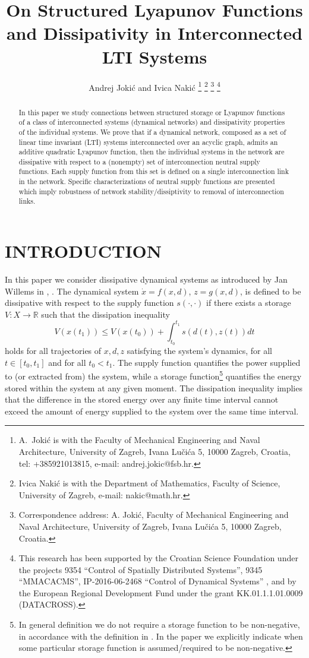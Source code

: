 \documentclass[11pt,a4paper,oneside,DIV=12,headings=small]{scrartcl}
\title{
On Structured Lyapunov Functions and Dissipativity in Interconnected LTI Systems
}
\author{Andrej Joki\'{c} and Ivica Naki\'{c}%
\thanks{A.\ Joki\'{c} is with the Faculty of Mechanical Engineering and Naval Architecture, University of Zagreb, Ivana Lu\v{c}i{\'c}a 5, 10000 Zagreb, Croatia, tel: +385921013815, e-mail: andrej.jokic@fsb.hr.}
\thanks{Ivica Naki\'{c} is with the Department of Mathematics,
        Faculty of Science, University of Zagreb,
        e-mail: nakic@math.hr.}%
\thanks{Correspondence address: A. Joki\'{c}, Faculty of Mechanical Engineering and Naval Architecture, University of Zagreb, Ivana Lu\v{c}i{\'c}a 5, 10000 Zagreb, Croatia.}
\thanks{This research has been supported by the Croatian Science Foundation under the projects 9354 ``Control of Spatially Distributed Systems'', 9345 ``MMACACMS'', IP-2016-06-2468 ``Control of Dynamical Systems''
, and by the European Regional Development Fund under the grant KK.01.1.1.01.0009 (DATACROSS).}
}
\newcommand{\Rset}{\mathbb{R}}
\theoremstyle{plain}
\begin{document}
\maketitle



\begin{abstract}
In this paper we study connections between structured storage or Lyapunov functions of a class of interconnected systems (dynamical networks) and dissipativity properties of the individual systems. We prove that if a dynamical network, composed as a set of linear time invariant (LTI) systems interconnected over an acyclic graph, admits an additive quadratic Lyapunov function, then the individual systems in the network are dissipative with respect to a (nonempty) set of interconnection neutral supply functions. Each supply function from this set is defined on a single interconnection link in the network. Specific characterizations of neutral supply functions are presented which imply robustness of network stability/dissiptivity to removal of interconnection links. 
\end{abstract}


\section{INTRODUCTION}
\label{Sec1}

In this paper we consider dissipative dynamical systems as introduced by Jan Willems in \cite{Willems_1}, \cite{Willems_2}. 
The dynamical system $\dot{x}=f(x,d)$, $z=g(x,d)$, is defined to be dissipative with respect to the supply function $s(\cdot,\cdot)$ if there exists a storage $V:X\rightarrow \Rset$ such that the dissipation inequality
\begin{equation}
\label{DssipativityInequality1}
V(x(t_1))\leq V(x(t_0))+ \int_{t_0}^{t_1} s(d(t),z(t))dt 
\end{equation}  
holds for all trajectories of $x, d, z$ satisfying the system's dynamics, for all $t\in [t_0,t_1]$ and for all $t_0<t_1$. 
The supply function quantifies the power supplied to (or extracted from) the system, while a storage function\footnote{In general definition we do not require a storage function to be non-negative, in accordance with the definition in \cite{Willems_Trentleman}. In the paper we explicitly indicate when some particular storage function is assumed/required to be non-negative.} quantifies the energy stored within the system at any given moment. The dissipation inequality implies that the difference in the stored energy over any finite time interval cannot exceed the amount of energy supplied to the system over the same time interval.  
\end{document}

